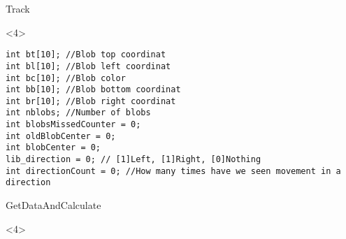 \begin{frame}[fragile]{Track}
\begin{onlyenv}<4>
\begin{center}
\begin{minipage}[H]{0.9\linewidth}
\begin{lstlisting}
int bt[10]; //Blob top coordinat
int bl[10]; //Blob left coordinat
int bc[10]; //Blob color
int bb[10]; //Blob bottom coordinat
int br[10]; //Blob right coordinat
int nblobs; //Number of blobs
int blobsMissedCounter = 0;
int oldBlobCenter = 0;
int blobCenter = 0;
lib_direction = 0; // [1]Left, [1]Right, [0]Nothing
int directionCount = 0; //How many times have we seen movement in a direction
\end{lstlisting} 
\end{minipage}
\end{center}
\end{onlyenv}
\end{frame}

\begin{frame}[fragile]{GetDataAndCalculate}
\begin{onlyenv}<4>
\begin{center}
\begin{minipage}[H]{0.9\linewidth}
\begin{lstlisting}

\end{lstlisting} 
\end{minipage}
\end{center}
\end{onlyenv}
\end{frame}

